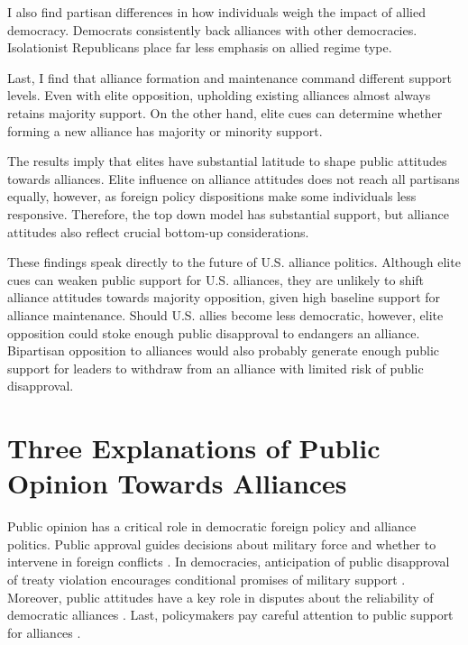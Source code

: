\documentclass[12pt]{article}
\begin{document}
I also find partisan differences in how individuals weigh the impact of allied democracy. 
Democrats consistently back alliances with other democracies. 
Isolationist Republicans place far less emphasis on allied regime type. 


Last, I find that alliance formation and maintenance command different support levels.
Even with elite opposition, upholding existing alliances almost always retains majority support. 
On the other hand, elite cues can determine whether forming a new alliance has majority or minority support. 


The results imply that elites have substantial latitude to shape public attitudes towards alliances. 
Elite influence on alliance attitudes does not reach all partisans equally, however, as foreign policy dispositions make some individuals less responsive. 
Therefore, the top down model has substantial support, but alliance attitudes also reflect crucial bottom-up considerations.


These findings speak directly to the future of U.S. alliance politics. 
Although elite cues can weaken public support for U.S. alliances, they are unlikely to shift alliance attitudes towards majority opposition, given high baseline support for alliance maintenance.
Should U.S. allies become less democratic, however, elite opposition could stoke enough public disapproval to endangers an alliance.
Bipartisan opposition to alliances would also probably generate enough public support for leaders to withdraw from an alliance with limited risk of public disapproval.  




\section{Three Explanations of Public Opinion Towards Alliances}

Public opinion has a critical role in democratic foreign policy and alliance politics.
Public approval guides decisions about military force and whether to intervene in foreign conflicts \citep{Tomzetal2020, LinGreenberg2021}. 
In democracies, anticipation of public disapproval of treaty violation encourages conditional promises of military support \citep{Chibaetal2015, FjelstulReiter2019}. 
Moreover, public attitudes have a key role in disputes about the reliability of democratic alliances \citep{Gaubatz1996, GartzkeGleditsch2004}. 
Last, policymakers pay careful attention to public support for alliances \citep{Sayle2019}. 
\end{document}
